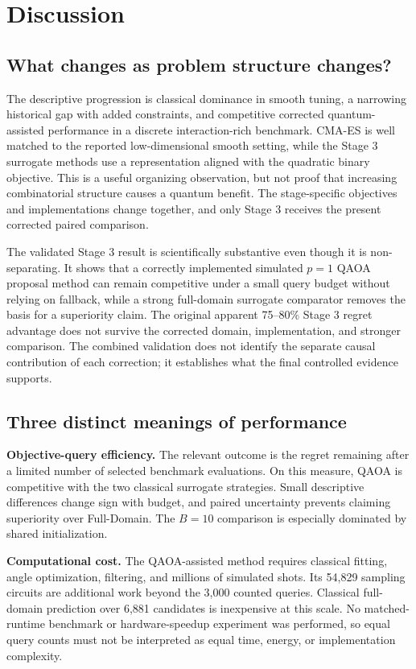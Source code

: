 \documentclass[11pt,letterpaper]{article}
\begin{document}
\section{Discussion}
\subsection{What changes as problem structure changes?}
The descriptive progression is classical dominance in smooth tuning, a narrowing historical gap with added constraints, and competitive corrected quantum-assisted performance in a discrete interaction-rich benchmark. CMA-ES is well matched to the reported low-dimensional smooth setting, while the Stage 3 surrogate methods use a representation aligned with the quadratic binary objective. This is a useful organizing observation, but not proof that increasing combinatorial structure causes a quantum benefit. The stage-specific objectives and implementations change together, and only Stage 3 receives the present corrected paired comparison.

The validated Stage 3 result is scientifically substantive even though it is non-separating. It shows that a correctly implemented simulated $p=1$ QAOA proposal method can remain competitive under a small query budget without relying on fallback, while a strong full-domain surrogate comparator removes the basis for a superiority claim. The original apparent 75--80\% Stage 3 regret advantage does not survive the corrected domain, implementation, and stronger comparison. The combined validation does not identify the separate causal contribution of each correction; it establishes what the final controlled evidence supports.

\subsection{Three distinct meanings of performance}
\textbf{Objective-query efficiency.} The relevant outcome is the regret remaining after a limited number of selected benchmark evaluations. On this measure, QAOA is competitive with the two classical surrogate strategies. Small descriptive differences change sign with budget, and paired uncertainty prevents claiming superiority over Full-Domain. The $B=10$ comparison is especially dominated by shared initialization.

\textbf{Computational cost.} The QAOA-assisted method requires classical fitting, angle optimization, filtering, and millions of simulated shots. Its 54,829 sampling circuits are additional work beyond the 3,000 counted queries. Classical full-domain prediction over 6,881 candidates is inexpensive at this scale. No matched-runtime benchmark or hardware-speedup experiment was performed, so equal query counts must not be interpreted as equal time, energy, or implementation complexity.
\end{document}
